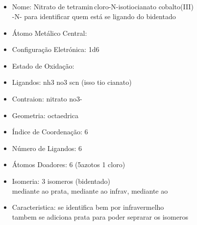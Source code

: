 \documentclass[12pt]{article}
\begin{document}
\noindent\begin{minipage}{\textwidth}
	
	\subsection{\ch{}}
	\begin{itemize}
	
   \item Nome:
   	Nitrato de tetramin\,cloro-N-isotiocianato cobalto(III)
		\\ -N- para identificar quem está se ligando do bidentado
   
   \item Átomo Metálico Central:
   	
   	
   \item Configuração Eletrónica:
   	1d6
   
   \item Estado de Oxidação:
   
   
   \item Ligandos:
   	nh3 no3 scn (isso tio cianato)
   
   \item Contraion:
   	nitrato no3-
   
   \item Geometria:
   	octaedrica
   
   \item Índice de Coordenação: 
   	6
   
   \item Número de Ligandos:
   	6
   
   \item Átomos Doadores:
   	6 (5azotos 1 cloro)
   
   \item Isomeria:
   	3 isomeros (bidentado)\\
		mediante ao prata, mediante ao infrav, mediante ao  
   
   \item Caracteristica:
   	se identifica bem por infravermelho\\
		tambem se adiciona prata para poder seprarar os isomeros
   
	\end{itemize}
	
\end{minipage}
\end{document}
